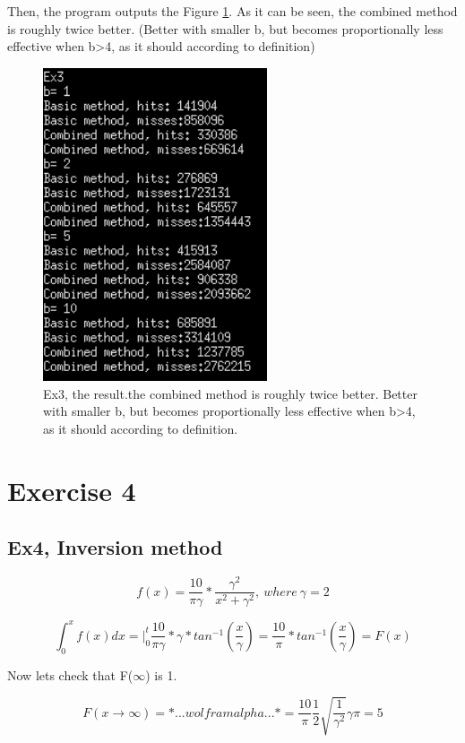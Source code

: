 \documentclass{article}
\begin{document}
Then, the program outputs the Figure \ref{fig:ex3result}. As it can be seen, the combined method is roughly twice better. (Better with smaller b, but becomes proportionally less effective when b>4, as it should according to definition)

\begin{figure}[!hbt]
	\includegraphics[width=250px]{"../Laskari2/ex3result"}
	\caption{Ex3, the result.the combined method is roughly twice better. Better with smaller b, but becomes proportionally less effective when b>4, as it should according to definition.}
	\label{fig:ex3result}
\end{figure}


\section*{Exercise 4}
\subsection*{Ex4, Inversion method}
\begin{equation}
	f(x)=\frac{10}{\pi \gamma}*\frac{\gamma^2}{x^2 + \gamma^2}, \ where \ \gamma =2
\end{equation}

\begin{equation}
	\int_{0}^{x}f(x)dx =\Big|_0^t \frac{10}{\pi \gamma} *\gamma *tan^{-1}\left(\frac{x}{\gamma}\right) = \frac{10}{\pi}*tan^{-1}\left(\frac{x}{\gamma}\right) =F(x)
\label{eq:Ex4F}
\end{equation}

Now lets check that F($\infty$) is 1.

\begin{equation}
	F(x\rightarrow\infty)=*...wolframalpha...*=\frac{10}{\pi}\frac{1}{2}\sqrt{\frac{1}{\gamma^2}}\gamma\pi =5
\end{equation}
\end{document}
